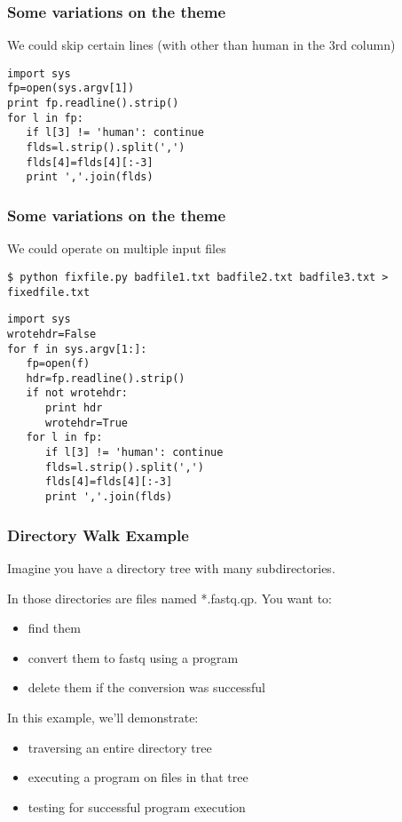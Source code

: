 \documentclass[10pt]{beamer}
\begin{document}
\begin{frame}[fragile]
\frametitle{Some variations on the theme}

We could skip certain lines (with other than human in the 3rd column)

\begin{verbatim}
import sys
fp=open(sys.argv[1])
print fp.readline().strip()
for l in fp:
   if l[3] != 'human': continue
   flds=l.strip().split(',')
   flds[4]=flds[4][:-3]
   print ','.join(flds)
\end{verbatim}
\end{frame}

\begin{frame}[fragile]
\frametitle{Some variations on the theme}

We could operate on multiple input files
\begin{verbatim}
$ python fixfile.py badfile1.txt badfile2.txt badfile3.txt > fixedfile.txt
\end{verbatim}

\begin{verbatim}
import sys
wrotehdr=False
for f in sys.argv[1:]:
   fp=open(f)
   hdr=fp.readline().strip()
   if not wrotehdr:
      print hdr
      wrotehdr=True
   for l in fp:
      if l[3] != 'human': continue
      flds=l.strip().split(',')
      flds[4]=flds[4][:-3]
      print ','.join(flds)
\end{verbatim}
\end{frame}


\begin{frame}[fragile]
\frametitle{Directory Walk Example}

Imagine you have a directory tree with many subdirectories.  
\vspace{2mm}

In those directories are files named *.fastq.qp.  You want to:
\begin{itemize}
\item find them
\item convert them to fastq using a program
\item delete them if the conversion was successful
\end{itemize}

In this example, we'll demonstrate:

\begin{itemize}
\item traversing an entire directory tree
\item executing a program on files in that tree
\item testing for successful program execution
\end{itemize}

\end{frame}
\end{document}
